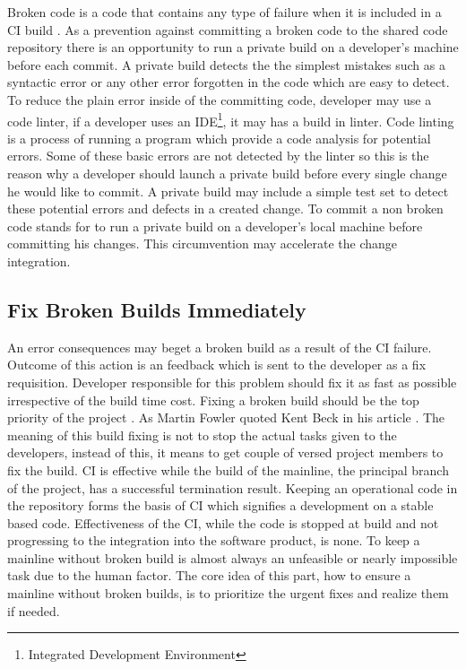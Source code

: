 Broken code is a code that contains any type of failure when it is included in a CI build \cite{CIQualityFramework}. As a prevention against committing a broken code to the shared code repository there is an opportunity to run a private build on a developer's machine before each commit. A private build detects the the simplest mistakes such as a syntactic error or any other error forgotten in the code which are easy to detect. To reduce the plain error inside of the committing code, developer may use a code linter, if a developer uses an IDE\footnote{Integrated Development Environment}, it may has a build in linter. Code linting is a process of running a program which provide a code analysis for potential errors. Some of these basic errors are not detected by the linter so this is the reason why a developer should launch a private build before every single change he would like to commit. A private build may include a simple test set to detect these potential errors and defects in a created change. To commit a non broken code stands for to run a private build on a developer's local machine before committing his changes. This circumvention may accelerate the change integration.

\subsection{Fix Broken Builds Immediately}

An error consequences may beget a broken build as a result of the CI failure. Outcome of this action is an feedback which is sent to the developer as a fix requisition. Developer responsible for this problem should fix it as fast as possible irrespective of the build time cost. Fixing a broken build should be the top priority of the project \cite{CIQualityFramework}. As Martin Fowler quoted Kent Beck in his article  \cite{MartinFowler}. The meaning of this build fixing is not to stop the actual tasks given to the developers, instead of this, it means to get couple of versed project members to fix the build. CI is effective while the build of the mainline, the principal branch of the project, has a successful termination result. Keeping an operational code in the repository forms the basis of CI which signifies a development on a stable based code. Effectiveness of the CI, while the code is stopped at build and not progressing to the integration into the software product, is none. To keep a mainline without broken build is almost always an unfeasible or nearly impossible task due to the human factor. The core idea of this part, how to ensure a mainline without broken builds, is to prioritize the urgent fixes and realize them if needed.\\

